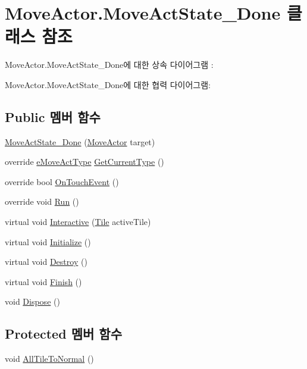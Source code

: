 \hypertarget{class_move_actor_1_1_move_act_state___done}{}\section{Move\+Actor.\+Move\+Act\+State\+\_\+\+Done 클래스 참조}
\label{class_move_actor_1_1_move_act_state___done}


Move\+Actor.\+Move\+Act\+State\+\_\+\+Done에 대한 상속 다이어그램 \+: 


Move\+Actor.\+Move\+Act\+State\+\_\+\+Done에 대한 협력 다이어그램\+:
\subsection*{Public 멤버 함수}
\begin{DoxyCompactItemize}
\item 
\hyperlink{class_move_actor_1_1_move_act_state___done_a9b6320c0503f3e898508c8fd500926af}{Move\+Act\+State\+\_\+\+Done} (\hyperlink{class_move_actor}{Move\+Actor} target)
\item 
override \hyperlink{_move_actor_8cs_a1df5a2532cc7e6bde40a57d2dcbe23fe}{e\+Move\+Act\+Type} \hyperlink{class_move_actor_1_1_move_act_state___done_a5c487d834573da3e3a5cf3a751ee0c02}{Get\+Current\+Type} ()
\item 
override bool \hyperlink{class_move_actor_1_1_move_act_state___done_aed4a067b6d21ce96d826ecd67e7666da}{On\+Touch\+Event} ()
\item 
override void \hyperlink{class_move_actor_1_1_move_act_state___done_a50f24c5382008b0205b7d5280880600f}{Run} ()
\item 
virtual void \hyperlink{class_move_actor_1_1_move_act_state_ae43bc38159d36bd83eaf172d946c0415}{Interactive} (\hyperlink{class_tile}{Tile} active\+Tile)
\item 
virtual void \hyperlink{class_f_z_1_1_state_a27ac6fd2e844476017b35aa781d73c8c}{Initialize} ()
\item 
virtual void \hyperlink{class_f_z_1_1_state_aa85fdf4a5495d6d5d3ed4aeda3497c8a}{Destroy} ()
\item 
virtual void \hyperlink{class_f_z_1_1_state_a288bb8c3fceee4bf03f01e295dcef1be}{Finish} ()
\item 
void \hyperlink{class_f_z_1_1_state_a598887d3fbb412fada132dc1c079b25b}{Dispose} ()
\end{DoxyCompactItemize}
\subsection*{Protected 멤버 함수}
\begin{DoxyCompactItemize}
\item 
void \hyperlink{class_move_actor_1_1_move_act_state_a8e1d5e7942d4f9de8c8e0732964c554b}{All\+Tile\+To\+Normal} ()
\end{DoxyCompactItemize}
